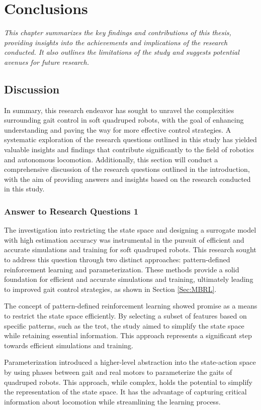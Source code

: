 \chapter{Conclusions}
\label{chap6}
\textit{This chapter summarizes the key findings and contributions of this thesis, providing insights into the achievements and implications of the research conducted. It also outlines the limitations of the study and suggests potential avenues for future research.}

\section{Discussion}
In summary, this research endeavor has sought to unravel the complexities surrounding gait control in soft quadruped robots, with the goal of enhancing understanding and paving the way for more effective control strategies. A systematic exploration of the research questions outlined in this study has yielded valuable insights and findings that contribute significantly to the field of robotics and autonomous locomotion. Additionally, this section will conduct a comprehensive discussion of the research questions outlined in the introduction, with the aim of providing answers and insights based on the research conducted in this study.

\subsection{Answer to Research Questions 1}
The investigation into restricting the state space and designing a surrogate model with high estimation accuracy was instrumental in the pursuit of efficient and accurate simulations and training for soft quadruped robots. This research sought to address this question through two distinct approaches: pattern-defined reinforcement learning and parameterization. These methods provide a solid foundation for efficient and accurate simulations and training, ultimately leading to improved gait control strategies, as shown in Section \ref{Sec:MBRL}. 

The concept of pattern-defined reinforcement learning showed promise as a means to restrict the state space efficiently. By selecting a subset of features based on specific patterns, such as the trot, the study aimed to simplify the state space while retaining essential information. This approach represents a significant step towards efficient simulations and training.

Parameterization introduced a higher-level abstraction into the state-action space by using phases between gait and real motors to parameterize the gaits of quadruped robots. This approach, while complex, holds the potential to simplify the representation of the state space. It has the advantage of capturing critical information about locomotion while streamlining the learning process.

